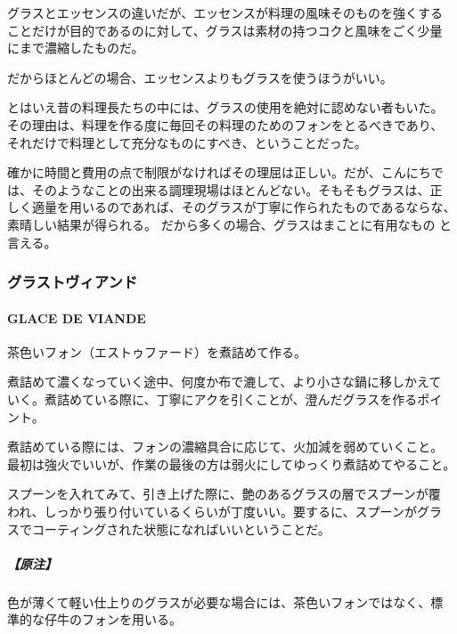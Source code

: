 \begin{recette}
グラスとエッセンスの違いだが、エッセンスが料理の風味そのものを強くする
ことだけが目的であるのに対して、グラスは素材の持つコクと風味をごく少量
にまで濃縮したものだ。

だからほとんどの場合、エッセンスよりもグラスを使うほうがいい。

とはいえ昔の料理長たちの中には、グラスの使用を絶対に認めない者もいた。
その理由は、料理を作る度に毎回その料理のためのフォンをとるべきであり、
それだけで料理として充分なものにすべき、ということだった。

確かに時間と費用の点で制限がなければその理屈は正しい。だが、こんにちで
は、そのようなことの出来る調理現場はほとんどない。そもそもグラスは、正
しく適量を用いるのであれば、そのグラスが丁寧に作られたものであるならな、
素晴しい結果が得られる。 だから多くの場合、グラスはまことに有用なもの
と言える。

\maeaki

\hypertarget{ux30b0ux30e9ux30b9ux30c8ux30f4ux30a3ux30a2ux30f3ux30c9}{%
\subsubsection{グラストヴィアンド}\label{ux30b0ux30e9ux30b9ux30c8ux30f4ux30a3ux30a2ux30f3ux30c9}}

\hypertarget{glace-de-viande}{%
\paragraph{GLACE DE VIANDE}\label{glace-de-viande}}


茶色いフォン（エストゥファード）を煮詰めて作る。

煮詰めて濃くなっていく途中、何度か布で漉して、より小さな鍋に移しかえて
いく。煮詰めている際に、丁寧にアクを引くことが、澄んだグラスを作るポイ
ント。

煮詰めている際には、フォンの濃縮具合に応じて、火加減を弱めていくこと。
最初は強火でいいが、作業の最後の方は弱火にしてゆっくり煮詰めてやること。

スプーンを入れてみて、引き上げた際に、艶のあるグラスの層でスプーンが覆
われ、しっかり張り付いているくらいが丁度いい。要するに、スプーンがグラ
スでコーティングされた状態になればいいということだ。

\hypertarget{ux539fux6ce8-5}{%
\subparagraph{【原注】}\label{ux539fux6ce8-5}}

色が薄くて軽い仕上りのグラスが必要な場合には、茶色いフォンではなく、標
準的な仔牛のフォンを用いる。


\end{recette}
